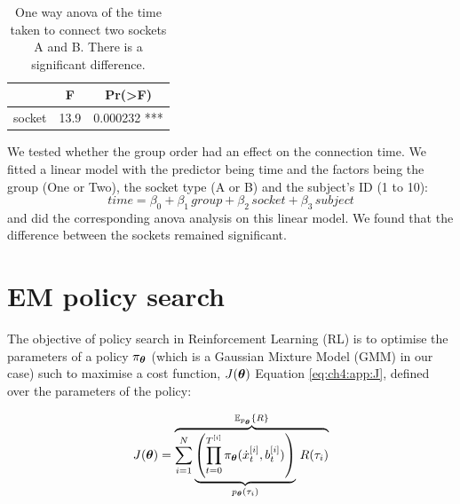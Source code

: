 \begin{appendices}
\begin{table}[h]
\centering
\begin{tabular}{lcc}
  \hline
          &   F    & Pr(>F)  	     \\ \hline
   socket & 13.9   &  0.000232 *** 
\end{tabular}
\caption{One way anova of the time taken to connect two sockets A and B. There is a significant difference.}
\label{tab:ch4:anova_socket}
\end{table}

We tested whether the group order had an effect on the connection time. We fitted a linear model
with the predictor being time and the factors being the group (One or Two), the socket type (A or B) 
and the subject's ID (1 to 10):
\begin{equation}
 time = \beta_0 + \beta_1\, group + \beta_2\, socket + \beta_3\, subject
\end{equation}
and did the corresponding anova analysis on this linear model. We found that the difference between the sockets 
remained significant.
\FloatBarrier
\section{EM policy search}\label{app:lb}
The objective of policy search in Reinforcement Learning (RL) is to optimise the parameters of a policy $\pi_{\boldsymbol{\theta}}$
(which is a Gaussian Mixture Model (GMM) in our case) such to maximise a cost 
function, $J(\boldsymbol{\theta})$ Equation \ref{eq:ch4:app:J}, defined over the parameters of the policy:


\begin{align}\label{eq:ch4:app:J}
 J(\boldsymbol{\theta}) = \overbrace{\sum\limits_{i=1}^{N}   \underbrace{\left( \prod_{t=0}^{T^{[i]}} \pi_{\boldsymbol{\theta}}(\dot{x}^{[i]}_t,b^{[i]}_t) \right)}_{p_{\boldsymbol{\theta}}(\tau_i)} \, R(\tau_i)}^{\mathbb{E}_{p_{\boldsymbol{\theta}}}\{R\}} 
\end{align}


\end{appendices}
